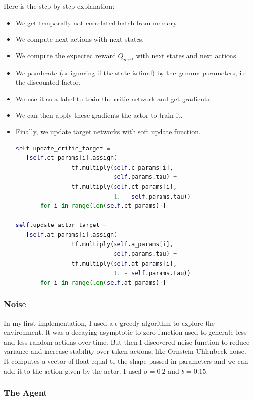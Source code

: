 \documentclass{article}
\begin{document}
Here is the step by step explanation:
\begin{itemize}
\item We get temporally not-correlated batch from memory.
\item We compute next actions with next states.
\item We compute the expected reward $Q_{next}$ with next states and next actions.
\item We ponderate (or ignoring if the state is final) by the gamma parameters,
  i.e the discounted factor.
\item We use it as a label to train the critic network and get gradients.
\item We can then apply these gradients the actor to train it.
\item Finally, we update target networks with soft update function.
  \begin{lstlisting}[language=Python]
self.update_critic_target =
   [self.ct_params[i].assign(
                tf.multiply(self.c_params[i], 
                            self.params.tau) + 
                tf.multiply(self.ct_params[i],
                            1. - self.params.tau))
       for i in range(len(self.ct_params))]
  
self.update_actor_target =
   [self.at_params[i].assign(
                tf.multiply(self.a_params[i], 
                            self.params.tau) +
                tf.multiply(self.at_params[i], 
                            1. - self.params.tau))
       for i in range(len(self.at_params))]
  \end{lstlisting}
\end{itemize}

\subsubsection{Noise}

In my first implementation, I used a $\epsilon$-greedy algorithm to explore the
environment. It was a decaying asymptotic-to-zero function used to generate less
and less random actions over time. But then I discovered noise function to
reduce variance and increase stability over taken actions, like
Ornstein-Uhlenbeck noise. It computes a vector of float equal to the shape
passed in parameters and we can add it to the action given by the actor. I used
$\sigma = 0.2$ and $\theta = 0.15$.

\subsubsection{The Agent}
\end{document}
